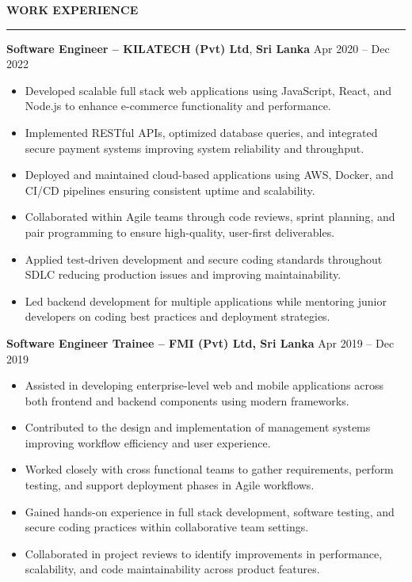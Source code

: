 \documentclass[10pt,letterpaper]{article}
\begin{document}
\vspace{8pt}

\textbf{WORK EXPERIENCE}\\[-8pt]
\noindent\rule{\textwidth}{1pt}

\vspace{-2pt}

\textbf{Software Engineer -- KILATECH (Pvt) Ltd}, \textbf{Sri Lanka} \hfill Apr 2020 -- Dec 2022

\vspace{-1pt}

\begin{itemize}
\item Developed scalable full stack web applications using JavaScript, React, and Node.js to enhance e-commerce functionality and performance.
\item Implemented RESTful APIs, optimized database queries, and integrated secure payment systems improving system reliability and throughput.
\item Deployed and maintained cloud-based applications using AWS, Docker, and CI/CD pipelines ensuring consistent uptime and scalability.
\item Collaborated within Agile teams through code reviews, sprint planning, and pair programming to ensure high-quality, user-first deliverables.
\item Applied test-driven development and secure coding standards throughout SDLC reducing production issues and improving maintainability.
\item Led backend development for multiple applications while mentoring junior developers on coding best practices and deployment strategies.
\end{itemize}

\textbf{Software Engineer Trainee -- FMI (Pvt) Ltd, Sri Lanka} \hfill Apr 2019 -- Dec 2019

\vspace{-1pt}

\begin{itemize}
\item Assisted in developing enterprise-level web and mobile applications across both frontend and backend components using modern frameworks.
\item Contributed to the design and implementation of management systems improving workflow efficiency and user experience.
\item Worked closely with cross functional teams to gather requirements, perform testing, and support deployment phases in Agile workflows.
\item Gained hands-on experience in full stack development, software testing, and secure coding practices within collaborative team settings.
\item Collaborated in project reviews to identify improvements in performance, scalability, and code maintainability across product features.
\end{itemize}
\end{document}
